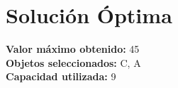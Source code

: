 \documentclass{article}
\begin{document}
\section*{Solución Óptima}
\textbf{Valor máximo obtenido:} 45\\
\textbf{Objetos seleccionados:} C, A\\
\textbf{Capacidad utilizada:} 9\\
\end{document}
